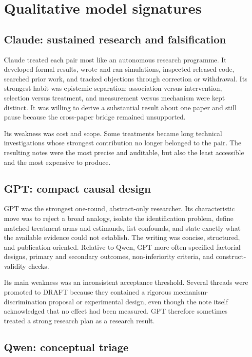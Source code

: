 \documentclass[11pt,a4paper]{article}
\begin{document}
\section{Qualitative model signatures}

\subsection{Claude: sustained research and falsification}

Claude treated each pair most like an autonomous research programme.  It
developed formal results, wrote and ran simulations, inspected released code,
searched prior work, and tracked objections through correction or withdrawal.
Its strongest habit was epistemic separation: association versus intervention,
selection versus treatment, and measurement versus mechanism were kept
distinct.  It was willing to derive a substantial result about one paper and
still pause because the cross-paper bridge remained unsupported.

Its weakness was cost and scope.  Some treatments became long technical
investigations whose strongest contribution no longer belonged to the pair.
The resulting notes were the most precise and auditable, but also the least
accessible and the most expensive to produce.

\subsection{GPT: compact causal design}

GPT was the strongest one-round, abstract-only researcher.  Its characteristic
move was to reject a broad analogy, isolate the identification problem, define
matched treatment arms and estimands, list confounds, and state exactly what
the available evidence could not establish.  The writing was concise,
structured, and publication-oriented.  Relative to Qwen, GPT more often
specified factorial designs, primary and secondary outcomes, non-inferiority
criteria, and construct-validity checks.

Its main weakness was an inconsistent acceptance threshold.  Several threads
were promoted to DRAFT because they contained a rigorous mechanism-discrimination
proposal or experimental design, even though the note itself acknowledged
that no effect had been measured.  GPT therefore sometimes treated a strong
research plan as a research result.

\subsection{Qwen: conceptual triage}
\end{document}
